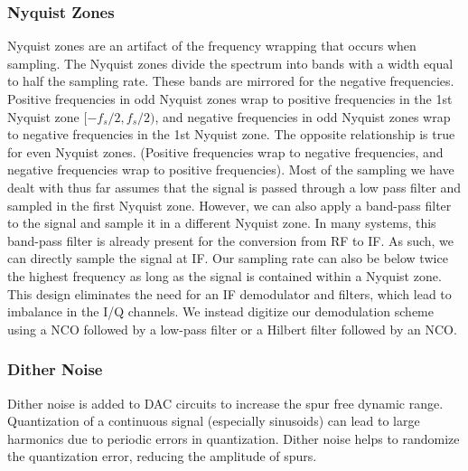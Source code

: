\documentclass{article}
\begin{document}
	\subsubsection{Nyquist Zones}
	Nyquist zones are an artifact of the frequency wrapping that occurs when sampling. The Nyquist zones divide the spectrum into bands with a width equal to half the sampling rate. These bands are mirrored for the negative frequencies. Positive frequencies in odd Nyquist zones wrap to positive frequencies in the 1st Nyquist zone $[-f_s/2, f_s/2)$, and negative frequencies in odd Nyquist zones wrap to negative frequencies in the 1st Nyquist zone. The opposite relationship is true for even Nyquist zones. (Positive frequencies wrap to negative frequencies, and negative frequencies wrap to positive frequencies). Most of the sampling we have dealt with thus far assumes that the signal is passed through a low pass filter and sampled in the first Nyquist zone. However, we can also apply a band-pass filter to the signal and sample it in a different Nyquist zone. In many systems, this band-pass filter is already present for the conversion from RF to IF. As such, we can directly sample the signal at IF. Our sampling rate can also be below twice the highest frequency as long as the signal is contained within a Nyquist zone. This design eliminates the need for an IF demodulator and filters, which lead to imbalance in the I/Q channels. We instead digitize our demodulation scheme using a NCO followed by a low-pass filter or a Hilbert filter followed by an NCO.
	
	
	\subsubsection{Dither Noise}
	Dither noise is added to DAC circuits to increase the spur free dynamic range. Quantization of a continuous signal (especially sinusoids) can lead to large harmonics due to periodic errors in quantization. Dither noise helps to randomize the quantization error, reducing the amplitude of spurs.
	



\end{document}
